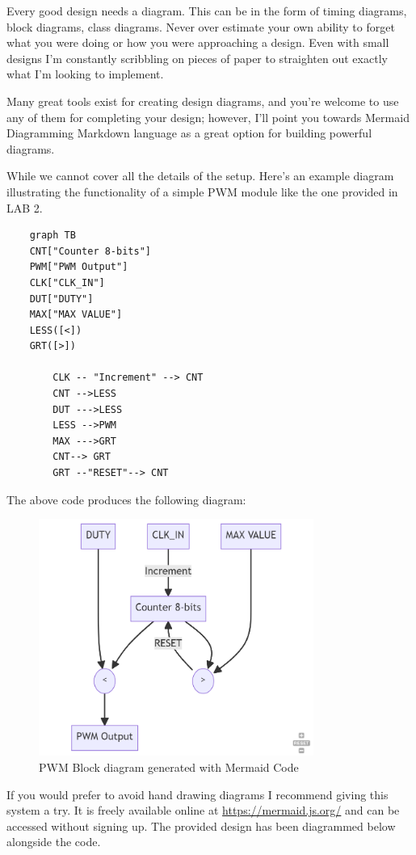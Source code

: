 Every good design needs a diagram. This can be in the form of timing diagrams, block diagrams, class diagrams. Never over estimate your own ability to forget what you were doing or how you were approaching a design. Even with small designs I'm constantly scribbling on pieces of paper to straighten out exactly what I'm looking to implement. 

Many great tools exist for creating design diagrams, and you're welcome to use any of them for completing your design; however, I'll point you towards Mermaid Diagramming Markdown language as a great option for building powerful diagrams. 

While we cannot cover all the details of the setup. Here's an example diagram illustrating the functionality of a simple PWM module like the one provided in LAB 2.
\begin{verbatim}
    graph TB
    CNT["Counter 8-bits"]
    PWM["PWM Output"]
    CLK["CLK_IN"]
    DUT["DUTY"]
    MAX["MAX VALUE"]
    LESS([<])
    GRT([>])
  
        CLK -- "Increment" --> CNT
        CNT -->LESS
        DUT --->LESS
        LESS -->PWM
        MAX --->GRT
        CNT--> GRT
        GRT --"RESET"--> CNT
\end{verbatim}

The above code produces the following diagram:
\begin{figure} [H]
    \centering
    \includegraphics[width = 9cm]{Images/ProvidedPWM/PWM_block_diagram.png}
    \caption{PWM Block diagram generated with Mermaid Code}
    \label{fig:enter-label}
\end{figure}

If you would prefer to avoid hand drawing diagrams I recommend giving this system a try. It is freely available online at \url{https://mermaid.js.org/} and can be accessed without signing up. The provided design has been diagrammed below alongside the code.

